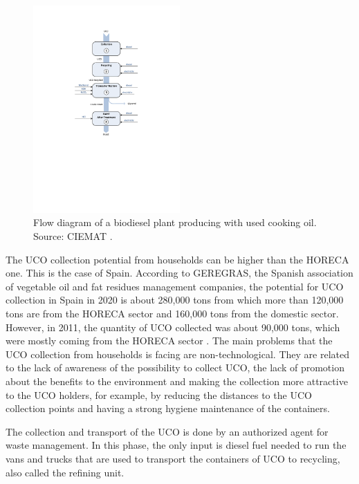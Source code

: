 \documentclass[sustainability,article,accept,moreauthors,pdftex,12pt,a4paper]{mdpi}
\begin{document}
\begin{figure}[H]
\centering
\includegraphics[width=0.5\textwidth]{Figure1}
\caption[Flow diagram of a biodiesel plant producing with Used Cooking Oil]{Flow diagram of a biodiesel plant producing with used cooking oil. Source: CIEMAT \cite{CIEMAT2005}. } 
\label{fig1}
\end{figure}
 
The UCO collection potential from households can be higher than the HORECA one. This is the case of Spain. According to GEREGRAS, the Spanish association of vegetable oil and fat residues management companies, the potential for UCO collection in Spain in 2020 is about 280,000 tons from which more than 120,000 tons are from the HORECA sector and 160,000 tons from the domestic sector. However, in 2011, the quantity of UCO collected was about 90,000 tons, which were mostly coming from the HORECA sector \cite{IDAEPER}. The main problems that the UCO collection from households is facing are non-technological. They are related to the lack of awareness of the possibility to collect UCO, the lack of promotion about the benefits to the environment and making the collection more attractive to the UCO holders, for example, by reducing the distances to the UCO collection points and having a strong hygiene maintenance of the containers.
 
The collection and transport of the UCO is done by an authorized agent for waste management. In this phase, the only input is diesel fuel needed to run the vans and trucks that are used to transport the containers of UCO to recycling, also called the refining unit.
\end{document}
